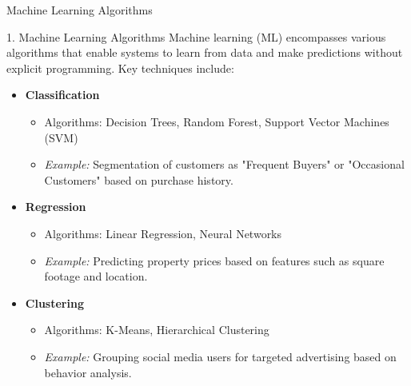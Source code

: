 \documentclass[aspectratio=169]{beamer}
\begin{document}
\begin{frame}[fragile]{Machine Learning Algorithms}
    \begin{block}{1. Machine Learning Algorithms}
        Machine learning (ML) encompasses various algorithms that enable systems to learn from data and make predictions without explicit programming. Key techniques include:
    \end{block}
    \begin{itemize}
        \item \textbf{Classification}
            \begin{itemize}
                \item Algorithms: Decision Trees, Random Forest, Support Vector Machines (SVM)
                \item \textit{Example:} Segmentation of customers as "Frequent Buyers" or "Occasional Customers" based on purchase history.
            \end{itemize}
        
        \item \textbf{Regression}
            \begin{itemize}
                \item Algorithms: Linear Regression, Neural Networks
                \item \textit{Example:} Predicting property prices based on features such as square footage and location.
            \end{itemize}

        \item \textbf{Clustering}
            \begin{itemize}
                \item Algorithms: K-Means, Hierarchical Clustering
                \item \textit{Example:} Grouping social media users for targeted advertising based on behavior analysis.
            \end{itemize}
    \end{itemize}
\end{frame}
\end{document}
